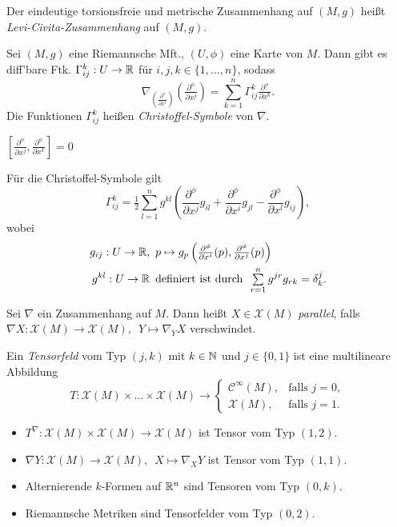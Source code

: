 \documentclass{cheat-sheet}
\newcommand{\coord}[1]{\tfrac{\partial^\phi}{\partial x^{#1}}} %
\newcommand{\Coord}[1]{\frac{\partial^\phi}{\partial x^{#1}}} %
\newcommand{\lie}[2]{\left[ {#1}, {#2} \right]} %
\newcommand{\Cont}{\mathcal{C}} %
\newcommand{\VF}{\mathcal{X}} %
\begin{document}
\begin{defn}
  Der eindeutige torsionsfreie und metrische Zusammenhang auf $(M, g)$ heißt \emph{Levi-Civita-Zusammenhang} auf $(M, g)$.
\end{defn}

\begin{bem}
  Sei $(M, g)$ eine Riemannsche Mft., $(U, \phi)$ eine Karte von $M$. Dann gibt es diff'bare Ftk. $\Gamma_{ij}^k : U \to \mathbb{R}$ für $i,j,k \in \{ 1, \ldots, n \}$, sodass
  \[
    \nabla_{\left( \coord{i} \right)} \left( \coord{j} \right) = \sum_{k=1}^n \Gamma_{ij}^k \coord{k}.
  \]
  Die Funktionen $\Gamma_{ij}^k$ heißen \emph{Christoffel-Symbole} von $\nabla$.
\end{bem}


\begin{lem}
  $\lie{\coord{j}}{\coord{k}} = 0$
\end{lem}

\begin{satz}
  Für die Christoffel-Symbole gilt
  \[ \Gamma_{ij}^k = \tfrac{1}{2} \sum_{l=1}^n g^{kl} \left( \Coord{j} g_{il} + \Coord{i} g_{jl} - \Coord{l} g_{ij} \right), \]
  wobei
  \begin{align*}
    g_{ij} : U \to \R, & \enspace p \mapsto g_p \left( \coord{i} (p), \coord{j} (p) \right) \\
    g^{kl} : U \to \R & \enspace \text{definiert ist durch} \enspace \sum_{r=1}^n g^{jr} g_{rk} = \delta_k^j.
  \end{align*}
\end{satz}

\begin{defn}
  Sei $\nabla$ ein Zusammenhang auf $M$. Dann heißt $X \in \VF(M)$ \emph{parallel}, falls
  $\nabla X : \VF(M) \to \VF(M), \enspace Y \mapsto \nabla_Y X$
  verschwindet.
\end{defn}

\begin{defn}
  Ein \emph{Tensorfeld} vom Typ $(j, k)$ mit $k \in \mathbb{N}$ und $j \in \{ 0, 1 \}$ ist eine multilineare Abbildung
  \[
    T : \VF(M) \times \ldots \times \VF(M) \to
    \begin{cases}
      \Cont^\infty(M), & \text{falls } j = 0,\\
      \VF(M), & \text{falls } j = 1.
    \end{cases}
  \]
\end{defn}

\begin{bspe}
  \begin{itemize}
    \item $T^\nabla : \VF(M) \times \VF(M) \to \VF(M)$ ist Tensor vom Typ $(1, 2)$.
    \item $\nabla Y : \VF(M) \to \VF(M), \enspace X \mapsto \nabla_X Y$ ist Tensor vom Typ $(1, 1)$.
    \item Alternierende $k$-Formen auf $\mathbb{R}^n$ sind Tensoren vom Typ $(0, k)$.
    \item Riemannsche Metriken sind Tensorfelder vom Typ $(0, 2)$.
  \end{itemize}
\end{bspe}
\end{document}
